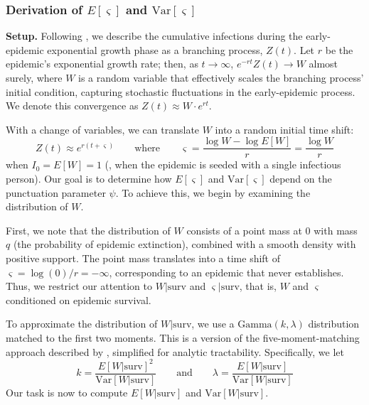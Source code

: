 \clearpage

\subsubsection*{Derivation of $E[\varsigma]$ and $\text{Var}[\varsigma]$}

{\bf Setup.} Following \citet{morris_computation_2024}, we describe the cumulative infections during the early-epidemic exponential growth phase as a branching process, $Z(t)$. Let $r$ be the epidemic's exponential growth rate; then, as $t \rightarrow \infty$, $e^{-rt} Z(t) \rightarrow W$ almost surely, where $W$ is a random variable that effectively scales the branching process' initial condition, capturing stochastic fluctuations in the early-epidemic process. We denote this convergence as $Z(t) \approx W \cdot e^{rt}$. 


With a change of variables, we can translate $W$ into a random initial time shift: 
%
\begin{equation}
	Z(t) \approx e^{r (t + \varsigma)} \qquad \text{where} \qquad \varsigma = \frac{\log W - \log E[W]}{r} = \frac{\log W}{r}
\end{equation}
%
when $I_0 = E[W] = 1$ (\ie, when the epidemic is seeded with a single infectious person). Our goal is to determine how $E[\varsigma]$ and $\text{Var}[\varsigma]$ depend on the punctuation parameter $\psi$. To achieve this, we begin by examining the distribution of $W$. 

 First, we note that the distribution of $W$ consists of a point mass at 0 with mass $q$ (the probability of epidemic extinction), combined with a smooth density with positive support. The point mass translates into a time shift of $\varsigma = \log(0) / r = -\infty$, corresponding to an epidemic that never establishes. Thus, we restrict our attention to $W | \text{surv}$ and $\varsigma | \text{surv}$, that is, $W$ and $\varsigma$ conditioned on epidemic survival. 

To approximate the distribution of $W|\text{surv}$, we use a $\text{Gamma}(k, \lambda)$ distribution matched to the first two moments. This is a version of the five-moment-matching approach described by \cite{morris_computation_2024}, simplified for analytic tractability. Specifically, we let  
\begin{equation}
	k = \frac{E[W|\text{surv}]^2}{\text{Var}[W|\text{surv}]} \qquad \text{and} \qquad \lambda = \frac{E[W|\text{surv}]}{\text{Var}[W|\text{surv}]}
	\label{eq:k_and_lambda}
\end{equation}
Our task is now to compute $E[W|\text{surv}]$ and $\text{Var}[W|\text{surv}]$. 

